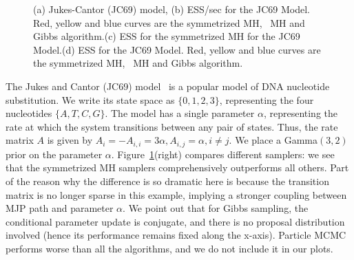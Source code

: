 \begin{figure}
\begin{minipage}[!hp]{0.24\linewidth}
\end{minipage}
  \caption{(a) Jukes-Cantor (JC69) model, (b)
    ESS/sec for the JC69 Model. Red, yellow and blue curves are the 
      symmetrized MH, \naive\ MH and Gibbs algorithm.(c)
    ESS for the symmetrized MH for the JC69 Model.(d)
    ESS for the JC69 Model. Red, yellow and blue curves are the 
      symmetrized MH, \naive\ MH and Gibbs algorithm. }
     \label{fig:ESS_JC}
 \end{figure}

  The Jukes and Cantor (JC69) model~\citep{jukescantor69} is a popular model of DNA nucleotide
  substitution.  We write its state space as $\{0, 1, 2, 3\}$, representing the 
  four nucleotides $\{A, T, C, G\}$.  The model has a single parameter $\alpha$, 
  representing the rate at which the system transitions between any pair of 
  states. Thus, the rate matrix $A$ is given by 
$A_i = -A_{i,i} = 3\alpha, A_{i, j} = \alpha,i \neq j.$
We place a Gamma$(3,2)$ prior on the parameter $\alpha$.
Figure~\ref{fig:ESS_JC}(right) compares different samplers: we see that the
symmetrized MH samplers comprehensively outperforms all others.
Part of the reason why the difference is so dramatic here is because the
transition matrix is no longer sparse in this example, implying a stronger
coupling between MJP path and parameter $\alpha$. We point out that for Gibbs
sampling, the conditional parameter update is conjugate, and there is no
proposal distribution involved (hence its performance remains fixed along
the x-axis). Particle MCMC performs worse
than all the algorithms, and we do not include it in our plots.
